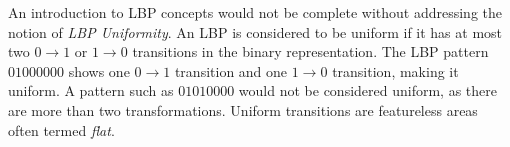 \documentclass[letterpaper]{report}
\begin{document}
An introduction to LBP concepts would not be complete without addressing the notion of \textit{LBP Uniformity}. An LBP is considered to be uniform if it has at most two $0 \rightarrow 1$ or $1 \rightarrow 0$ transitions in the binary representation. The LBP pattern $01000000$ shows one $0 \rightarrow 1$ transition and one $1 \rightarrow 0$ transition, making it uniform. A pattern such as $01010000$ would not be considered uniform, as there are more than two transformations. Uniform transitions are featureless areas often termed \textit{flat}.

%
\end{document}
